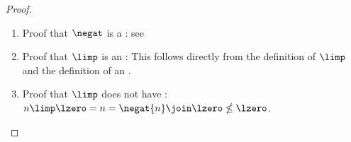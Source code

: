 \begin{proof}
\begin{enumerate}
  \item Proof that $\negat$ is a : see 
  \item Proof that $\limp$ is an : 
        This follows directly from the definition of $\limp$ and the definition of an  .
  \item Proof that $\limp$ does not have : $n\limp\lzero=n=\negat{n}\join\lzero\nleq\lzero$.
\end{enumerate}
\end{proof}

